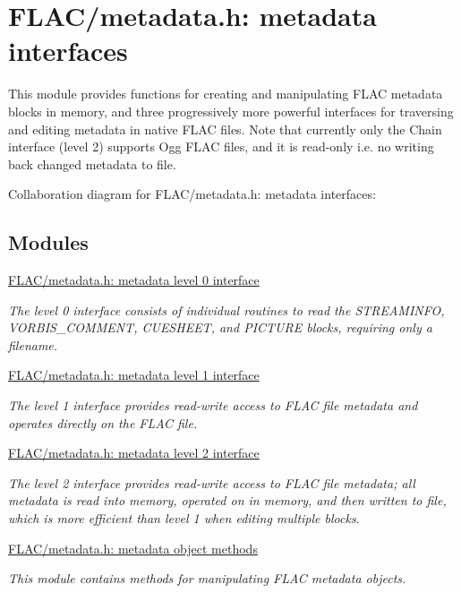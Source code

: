 \hypertarget{group__flac__metadata}{}\section{F\+L\+A\+C/metadata.h\+: metadata interfaces}
\label{group__flac__metadata}


This module provides functions for creating and manipulating F\+L\+AC metadata blocks in memory, and three progressively more powerful interfaces for traversing and editing metadata in native F\+L\+AC files. Note that currently only the Chain interface (level 2) supports Ogg F\+L\+AC files, and it is read-\/only i.\+e. no writing back changed metadata to file.  


Collaboration diagram for F\+L\+A\+C/metadata.h\+: metadata interfaces\+:
\subsection*{Modules}
\begin{DoxyCompactItemize}
\item 
\hyperlink{group__flac__metadata__level0}{F\+L\+A\+C/metadata.\+h\+: metadata level 0 interface}
\begin{DoxyCompactList}\small\item\em The level 0 interface consists of individual routines to read the S\+T\+R\+E\+A\+M\+I\+N\+FO, V\+O\+R\+B\+I\+S\+\_\+\+C\+O\+M\+M\+E\+NT, C\+U\+E\+S\+H\+E\+ET, and P\+I\+C\+T\+U\+RE blocks, requiring only a filename. \end{DoxyCompactList}\item 
\hyperlink{group__flac__metadata__level1}{F\+L\+A\+C/metadata.\+h\+: metadata level 1 interface}
\begin{DoxyCompactList}\small\item\em The level 1 interface provides read-\/write access to F\+L\+AC file metadata and operates directly on the F\+L\+AC file. \end{DoxyCompactList}\item 
\hyperlink{group__flac__metadata__level2}{F\+L\+A\+C/metadata.\+h\+: metadata level 2 interface}
\begin{DoxyCompactList}\small\item\em The level 2 interface provides read-\/write access to F\+L\+AC file metadata; all metadata is read into memory, operated on in memory, and then written to file, which is more efficient than level 1 when editing multiple blocks. \end{DoxyCompactList}\item 
\hyperlink{group__flac__metadata__object}{F\+L\+A\+C/metadata.\+h\+: metadata object methods}
\begin{DoxyCompactList}\small\item\em This module contains methods for manipulating F\+L\+AC metadata objects. \end{DoxyCompactList}\end{DoxyCompactItemize}


